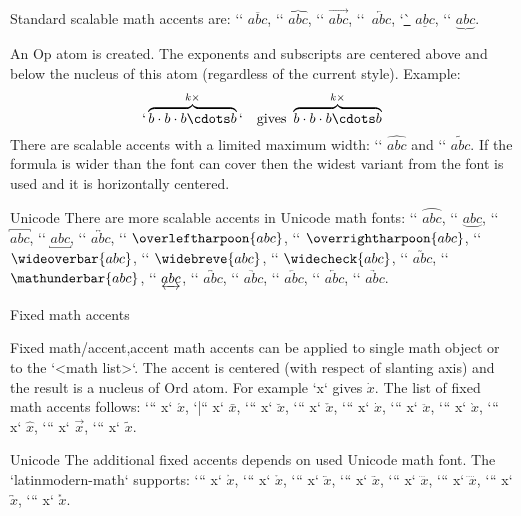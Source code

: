 Standard scalable math accents are:
\x`\overline` $\overline{abc}$,
\x`\overbrace` $\overbrace{abc}$,
\x`\overrightarrow` $\overrightarrow{abc}$,
\x`\overleftarrow`~$\overleftarrow{abc}$,
\x`\underline` $\underline{abc}$,
\x`\underbrace` $\underbrace{abc}$.

An Op atom is created. The exponents and subscripts are centered above
and below the nucleus of this atom (regardless of the current style). Example:
$$
  `\overbrace {b\cdot b\cdot b \cdots b}^{k\times}` \quad \hbox{gives }
  \overbrace {b\cdot b\cdot b \cdots b}^{k\times}
$$
There are scalable accents with a limited maximum width:
\x`\widehat` $\widehat{abc}$ and \x`\widetilde` $\widetilde{abc}$. If the
formula is wider than the font can cover then the widest variant from the
font is used and it is horizontally centered.

\new Unicode
There are more scalable accents in Unicode math fonts:
\x`\overparen` $\overparen{abc}$, \x`\underparen` $\underparen{abc}$,
\x`\overbracket` $\overbracket{abc}$, \x`\underbracket` $\underbracket{abc}$,
\x`\overleftrightarrow` $\overleftrightarrow{abc}$,
\x`\overleftharpoon` $\overleftharpoon{abc}$,
\x`\overrightharpoon` $\overrightharpoon{abc}$,
\x`\wideoverbar` $\wideoverbar{abc}$,
\x`\widebreve` $\widebreve{abc}$,
\x`\widecheck` $\widecheck{abc}$,\nl
\x`\wideutilde` $\wideutilde{abc}$,
\x`\mathunderbar` $\mathunderbar{abc}$,
\x`\underleftrightarrow` $\underleftrightarrow{abc}$,
\x`\widebridgeabove` $\widebridgeabove{abc}$,\nl
\x`\underrightharpoondown` $\underrightharpoondown{abc}$,
\x`\underleftharpoondown` $\underleftharpoondown{abc}$,
\x`\underleftarrow` $\underleftarrow{abc}$,\nl
\x`\underrightarrow` $\underrightarrow{abc}$.


\secc Fixed math accents

Fixed \ii math/accent,accent math accents can be applied to single math object or to the `{<math list>}`.
The accent is centered (with respect of slanting axis) and the result is a
nucleus of Ord
atom. For example `\dot x` gives $\dot x$. The list of fixed math accents
follows: \x`\acute`` x` $\acute x$, \x`\bar`` x` $\bar x$,
\x`\breve`` x` $\breve x$, \x`\check`` x` $\check x$,
\x`\dot`` x` $\dot x$, \x`\ddot`` x` $\ddot x$,
\x`\grave`` x` $\grave x$, \x`\hat`` x` $\hat x$,
\x`\vec`` x` $\vec x$, \x`\tilde`` x` $\tilde x$.

\new Unicode
The additional fixed accents depends on used Unicode math font. The
`latinmodern-math` supports:
\x`\ovhook`` x` $\ovhook x$, \x`\ocirc`` x` $\ocirc x$,
\x`\leftharpoonaccent`` x` $\leftharpoonaccent x$, \x`\rightharpoonaccent`` x` $\rightharpoonaccent x$,
\x`\dddot`` x` $\dddot x$, \x`\ddddot`` x` $\ddddot x$,
\x`\widebridgeabove`` x` $\widebridgeabove x$, \x`\asteraccent`` x` $\asteraccent x$.

